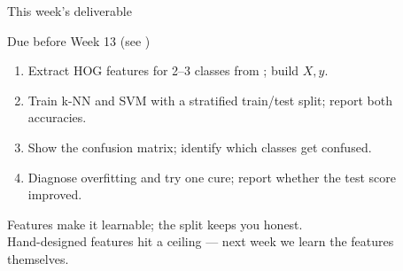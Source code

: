 \documentclass[10pt,aspectratio=169]{beamer}
\begin{document}
\begin{frame}{This week's deliverable}
  \begin{alertblock}{Due before Week 13 (see )}
    \begin{enumerate}
      \item Extract HOG features for 2--3 classes from ; build $X, y$.
      \item Train k-NN and SVM with a stratified train/test split; report both accuracies.
      \item Show the confusion matrix; identify which classes get confused.
      \item Diagnose overfitting and try one cure; report whether the test score improved.
    \end{enumerate}
  \end{alertblock}
\end{frame}

\begin{frame}[standout]
  Features make it learnable; the split keeps you honest.\\[4pt]
  \normalsize Hand-designed features hit a ceiling — next week we learn the features themselves.
\end{frame}
\end{document}
